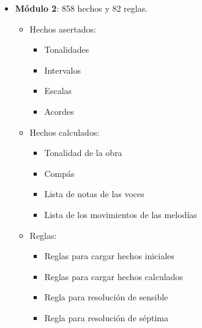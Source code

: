 \begin{itemize}
\begin{itemize}
\begin{itemize}
			\end{itemize}

	\end{itemize}

	\bigskip

	\item \textbf{Módulo 2}: 858 hechos y 82 reglas.

	\begin{itemize}

		\item Hechos asertados:

			\begin{itemize}

				\item Tonalidades

				\item Intervalos

				\item Escalas

				\item Acordes

			\end{itemize}

		\item Hechos calculados:

			\begin{itemize}

				\item Tonalidad de la obra

				\item Compás

				\item Lista de notas de las voces

				\item Lista de los movimientos de las melodías

			\end{itemize}

		\item Reglas:

			\begin{itemize}

				\item Reglas para cargar hechos iniciales

				\item Reglas para cargar hechos calculados

				\item Regla para resolución de sensible

				\item Regla para resolución de séptima


\end{itemize}
\end{itemize}
\end{itemize}
